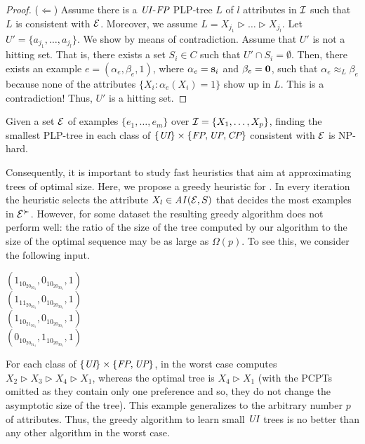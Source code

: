 \begin{proof}
\smallskip
\noindent
	($\Leftarrow$) Assume there is a $\textit{UI}$-$\textit{FP}$ PLP-tree $L$ of $l$ attributes in
	$\mathcal{I}$ such that $L$ is consistent with $\mathcal{E}$. Moreover, we assume
	$L=X_{j_1} \triangleright \ldots \triangleright X_{j_l}$.
	Let $U'=\{a_{j_1}, \ldots,a_{j_l}\}$.
	We show by means of contradiction.  Assume that $U'$ is not a hitting set.
	That is, there exists a set $S_i \in C$ such that
	$U' \cap S_i = \emptyset$.
	Then, there exists an example $e=(\alpha_e,\beta_e,1)$, where $\alpha_e=\textbf{s}_i$ 
	and $\beta_e=\textbf{0}$, such that $\alpha_e \approx_L \beta_e$ because
	none of the attributes $\{X_i:\alpha_e(X_i)=1\}$ show up in $L$. This is
	a contradiction! Thus, $U'$ is a hitting set.
\end{proof}

\begin{cor}
\label{cor:UIFP_smallest}
	Given a set $\mathcal{E}$ of examples $\{e_1,\ldots,e_m\}$ over $\mathcal{I}=\{X_1,\ldots,X_p\}$,
	finding the smallest PLP-tree in each class of $\{\textit{UI}\} \times \{\textit{FP},\textit{UP},\textit{CP}\}$ 
	consistent with $\mathcal{E}$ is NP-hard.
\end{cor}

Consequently, it is important to study fast heuristics that aim at
approximating trees of optimal size. 
Here, we propose a greedy heuristic for .
In every iteration the heuristic selects the attribute $X_l \in \mathit{AI}(\mathcal{E},S)$ that
decides the most examples in $\mathcal{E}^\succ$.
However, for some dataset the resulting greedy algorithm does not perform 
well: the ratio of the size of the tree computed by our algorithm 
to the size of the optimal sequence may be as large as $\Omega(p)$.
To see this, we consider the following input.

\begin{framed}
	\vspace{-0.2cm}
	\noindent $(1_10_20_30_4,0_10_20_30_4,1)$\\
	$(1_11_20_30_4,0_10_20_30_4,1)$\\
	$(1_10_21_30_4,0_10_20_30_4,1)$\\
	$(0_10_20_31_4,1_10_20_30_4,1)$
	\vspace{-0.2cm}
\end{framed}

For each class of $\{\textit{UI}\} \times \{\textit{FP},\textit{UP}\}$,  in the worst 
case computes $X_2 \triangleright X_3 \triangleright X_4 \triangleright X_1$,
whereas the optimal tree is $X_4 \triangleright X_1$ (with
the PCPTs omitted as they contain only one preference and so, they do not
change the asymptotic size of the tree). This example generalizes to the
arbitrary number $p$ of attributes. Thus, the greedy algorithm to learn small
$\textit{UI}$ trees is no better than any other algorithm in 
the worst case.

